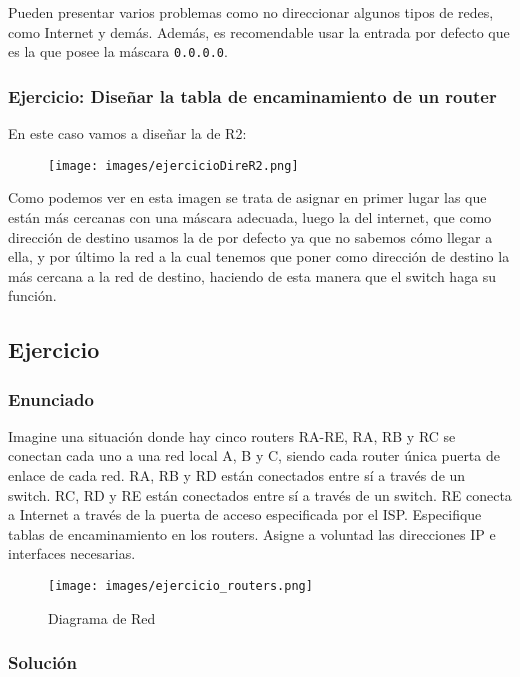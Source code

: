 \documentclass[a4paper,12pt]{article}
\begin{document}
Pueden presentar varios problemas como no direccionar algunos tipos de redes, como Internet y demás. Además, es recomendable usar la entrada por defecto que es la que posee la máscara \texttt{0.0.0.0}.

\subsubsection*{Ejercicio: Diseñar la tabla de encaminamiento de un router}

En este caso vamos a diseñar la de R2:
\begin{figure}[H]
    \centering
    \texttt{[image: images/ejercicioDireR2.png]}
\end{figure}
Como podemos ver en esta imagen se trata de asignar en primer lugar las que están más cercanas con una máscara adecuada, luego la del internet, que como dirección de destino usamos la de por defecto ya que no sabemos cómo llegar a ella, y por último la red a la cual tenemos que poner como dirección de destino la más cercana a la red de destino, haciendo de esta manera que el switch haga su función.

\subsection*{Ejercicio}

\subsubsection*{Enunciado}

Imagine una situación donde hay cinco routers RA-RE, RA, RB y RC se conectan cada uno a una red local A, B y C, siendo cada router única puerta de enlace de cada red. RA, RB y RD están conectados entre sí a través de un switch. RC, RD y RE están conectados entre sí a través de un switch. RE conecta a Internet a través de la puerta de acceso especificada por el ISP. Especifique tablas de encaminamiento en los routers. Asigne a voluntad las direcciones IP e interfaces necesarias.

\begin{figure}[H]
    \centering
    \texttt{[image: images/ejercicio\_routers.png]}
    \caption{Diagrama de Red}
\end{figure}

\subsubsection*{Solución}
\end{document}
